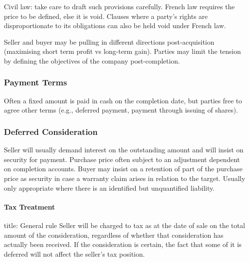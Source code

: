 \documentclass[
]{article}
\newenvironment{Shaded}{}{}
\newcommand{\NormalTok}[1]{#1}
\begin{document}
Civil law: take care to draft such provisions carefully. French law
requires the price to be defined, else it is void. Clauses where a
party's rights are disproportionate to its obligations can also be held
void under French law.

\begin{Shaded}
\begin{Highlighting}[]
\NormalTok{Seller and buyer may be pulling in different directions post{-}acquisition (maximising short term profit vs long{-}term gain). Parties may limit the tension by defining the objectives of the company post{-}completion. }
\end{Highlighting}
\end{Shaded}

\hypertarget{payment-terms}{%
\subsubsection{Payment Terms}\label{payment-terms}}

Often a fixed amount is paid in cash on the completion date, but parties
free to agree other terms (e.g., deferred payment, payment through
issuing of shares).

\hypertarget{deferred-consideration}{%
\subsubsection{Deferred Consideration}\label{deferred-consideration}}

Seller will usually demand interest on the outstanding amount and will
insist on security for payment. Purchase price often subject to an
adjustment dependent on completion accounts. Buyer may insist on a
retention of part of the purchase price as security in case a warranty
claim arises in relation to the target. Usually only appropriate where
there is an identified but unquantified liability.

\hypertarget{tax-treatment}{%
\paragraph{Tax Treatment}\label{tax-treatment}}

\begin{Shaded}
\begin{Highlighting}[]
\NormalTok{title: General rule}
\NormalTok{Seller will be charged to tax as at the date of sale on the total amount of the consideration, regardless of whether that consideration has actually been received. If the consideration is certain, the fact that some of it is deferred will not affect the seller’s tax position. }
\end{Highlighting}
\end{Shaded}
\end{document}
